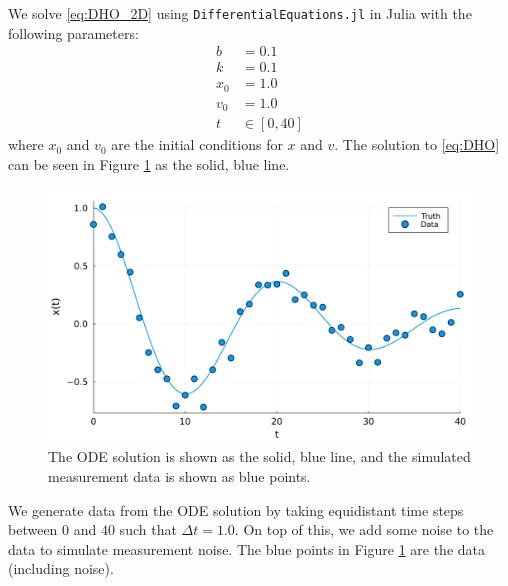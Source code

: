\documentclass[a4paper]{article}
\begin{document}
We solve \eqref{eq:DHO_2D} using \texttt{DifferentialEquations.jl} in Julia with the following parameters:
\begin{equation}
    \begin{split}
        b &= 0.1 \\
        k &= 0.1 \\
        x_0 &= 1.0 \\
        v_0 &= 1.0 \\
        t &\in [0, 40]
    \end{split}
\end{equation}
where $x_0$ and $v_0$ are the initial conditions for $x$ and $v$.
The solution to \eqref{eq:DHO} can be seen in Figure \ref{fig:DHO} as the solid, blue line.

\begin{figure}[htbp]
    \includegraphics[width=\linewidth]{truth.pdf}
    \caption{The ODE solution is shown as the solid, blue line, and the simulated measurement data is shown as blue points.}
    \label{fig:DHO}
\end{figure}

We generate data from the ODE solution by taking equidistant time steps between $0$ and $40$ such that $\Delta t = 1.0$.
On top of this, we add some noise to the data to simulate measurement noise.
The blue points in Figure \ref{fig:DHO} are the data (including noise).
\end{document}
